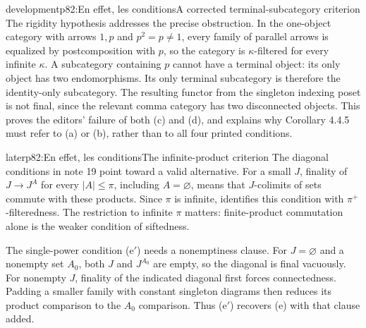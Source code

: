 \begin{dcomment}{development}{p82:En effet, les conditions}{A corrected terminal-subcategory criterion}
The rigidity hypothesis addresses the precise obstruction.  In the one-object category with arrows $1,p$ and $p^2=p\ne1$, every family of parallel arrows is equalized by postcomposition with $p$, so the category is $\kappa$-filtered for every infinite $\kappa$.  A subcategory containing $p$ cannot have a terminal object: its only object has two endomorphisms.  Its only terminal subcategory is therefore the identity-only subcategory.  The resulting functor from the singleton indexing poset is not final, since the relevant comma category has two disconnected objects.  This proves the editors' failure of both (c) and (d), and explains why Corollary 4.4.5 must refer to (a) or (b), rather than to all four printed conditions.
\end{dcomment}


\begin{dcomment}{later}{p82:En effet, les conditions}{The infinite-product criterion}
The diagonal conditions in note 19 point toward a valid alternative.  For a small $J$, finality of $J\to J^A$ for every $|A|\leq\pi$, including $A=\varnothing$, means that $J$-colimits of sets commute with these products.  Since $\pi$ is infinite, \citet[Theorem 3.1]{AdamekKoubekVelebil2000} identifies this condition with $\pi^+$-filteredness.  The restriction to infinite $\pi$ matters: finite-product commutation alone is the weaker condition of siftedness.

The single-power condition (e$'$) needs a nonemptiness clause.  For $J=\varnothing$ and a nonempty set $A_0$, both $J$ and $J^{A_0}$ are empty, so the diagonal is final vacuously.  For nonempty $J$, finality of the indicated diagonal first forces connectedness.  Padding a smaller family with constant singleton diagrams then reduces its product comparison to the $A_0$ comparison.  Thus (e$'$) recovers (e) with that clause added.
\end{dcomment}


